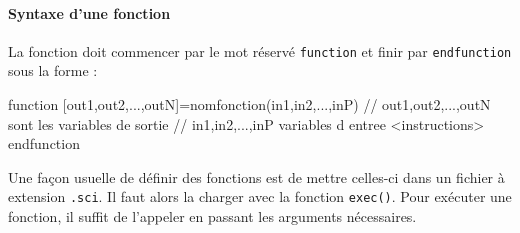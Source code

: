 \paragraph{Syntaxe d'une fonction}
La fonction doit commencer par le mot réservé \verb?function? et finir par 
\verb?endfunction? sous la forme :
\begin{Scilabcode}
function [out1,out2,...,outN]=nomfonction(in1,in2,...,inP)
    // out1,out2,...,outN sont les variables de sortie
    // in1,in2,...,inP variables d entree
    <instructions>
endfunction
\end{Scilabcode}
Une façon usuelle de définir des fonctions est de mettre 
celles-ci dans un fichier à extension \verb?.sci?. 
Il faut alors la charger avec la fonction \verb?exec()?.
Pour exécuter une fonction, il suffit de l'appeler en passant les 
arguments nécessaires.
